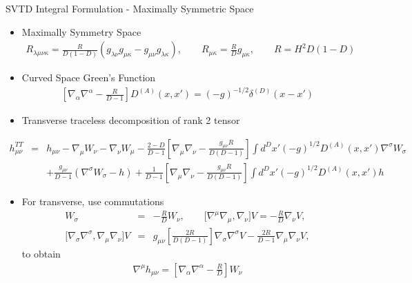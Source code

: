 \documentclass[8pt,aspectratio=1610]{beamer}
\begin{document}
\begin{frame}{SVTD Integral Formulation - Maximally Symmetric Space}
	\begin{itemize}
		\item Maximally Symmetry Space
		\begin{eqnarray}
		R_{\lambda\mu\nu\kappa} = \frac{R}{D(1-D)} (g_{\lambda\nu}g_{\mu\kappa} - g_{\mu\nu}g_{\lambda\kappa}),\qquad  R_{\mu\kappa} = \frac{R}{D}g_{\mu\kappa},\qquad	R=H^2D(1-D) 
		\end{eqnarray}
		\item Curved Space Green's Function
		\begin{eqnarray}
		\left[\nabla_\alpha \nabla^\alpha - \frac{R}{D-1}\right]D^{(A)}(x,x') = (-g)^{-1/2}\delta^{(D)} (x-x')
		\end{eqnarray}
		\item Transverse traceless decomposition of rank 2 tensor
	\end{itemize}
	\vspace{-1.5mm}
		\begin{eqnarray}
		h_{\mu\nu}^{TT} &=& h_{\mu\nu} - \nabla_\mu W_\nu - \nabla_\nu W_\mu 
		-\frac{2-D}{D-1}\left[ \nabla_\mu\nabla_\nu -\frac{ g_{\mu\nu}R}{D(D-1)}\right] \int d^Dx'(-g)^{1/2} D^{(A)}(x,x') \nabla^\sigma W_\sigma
		\nonumber\\
		&&+ \frac{g_{\mu\nu}}{D-1}(\nabla^\sigma W_\sigma - h)+\frac{1}{D-1}\left[ \nabla_\mu\nabla_\nu -\frac{g_{\mu\nu}R}{D(D-1)}\right] \int d^Dx'(-g)^{1/2} D^{(A)}(x,x') h
		\end{eqnarray}
	\vspace{-1.5mm}
	\begin{itemize}
		\item For transverse, use commutations
		\begin{eqnarray}
		[\nabla^\sigma, \nabla_\nu] W_\sigma &=& -\frac{R}{D}W_\nu
		,\qquad
		{[}\nabla^\mu \nabla_\mu, \nabla_\nu] V  = -\frac{R}{D}\nabla_\nu V
		,\nonumber\\
		{[}\nabla_\sigma\nabla^\sigma,\nabla_\mu\nabla_\nu]V &=& g_{\mu\nu}\left[\frac{2 R}{D(D-1)}\right]\nabla_\sigma\nabla^\sigma V - \frac{2R}{D-1}\nabla_\mu\nabla_\nu V,
		\end{eqnarray}
		to obtain
		\begin{eqnarray}
		\nabla^\mu h_{\mu\nu} = \left[ \nabla_\alpha\nabla^\alpha-\frac{R}{D} \right] W_\nu
		\end{eqnarray}
	\end{itemize}

\end{frame}
\end{document}
